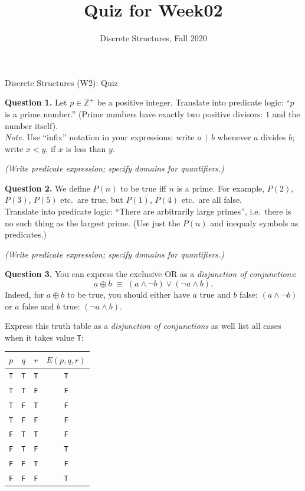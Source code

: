\documentclass[jou]{apa6}
\title{Quiz for Week02}
\author{Discrete Structures, Fall 2020}
\affiliation{RBS}
\begin{document}

\twocolumn
{\Large Discrete Structures (W2): Quiz}

\thispagestyle{empty}

\vspace{6pt}
{\bf Question 1.} Let $p \in \mathbb{Z}^{+}$ be a positive integer.
Translate into predicate logic: ``$p$ is a prime number.'' (Prime numbers
have exactly two positive divisors: $1$ and the number itself).\\
{\em Note.} Use ``infix'' notation in your expressions: write 
$a\,\mid\,b$ whenever $a$ divides $b$; write $x < y$, if $x$ is less than $y$.

{\scriptsize \em (Write predicate expression; specify domains for quantifiers.)}


\vspace{40pt}
{\bf Question 2.} We define $P(n)$ to be true
iff $n$ is a prime. For example, 
$P(2)$, $P(3)$, $P(5)$ etc.\ are true,
but $P(1)$, $P(4)$ etc.\ are all false.\\
Translate into predicate logic: ``There are arbitrarily large primes'', i.e.\ there is no 
such thing as the largest prime.
(Use just the $P(n)$ and inequaly symbols as predicates.)

\noindent
{\scriptsize \em (Write predicate expression; specify domains for quantifiers.)}



\vspace{40pt}
{\bf Question 3.} You can express the exclusive OR as a {\em disjunction of conjunctions}:
$$a \oplus b \;\equiv\; (a \wedge \neg b) \vee (\neg a \wedge b).$$ 
Indeed, for $a \oplus b$ to be true, you should 
either have $a$ true and $b$ false: $(a \wedge \neg b)$ or 
$a$ false and $b$ true: $(\neg a \wedge b)$. 

Express this truth table as a {\em disjunction of conjunctions} as well \textendash{}
list all cases when it takes value {\tt T}:

\begin{tabular}{ c | c | c | c }
$p$ & $q$ & $r$ & $E(p,q,r)$ \\ \hline
{\tt T} & {\tt T} & {\tt T} & {\tt T} \\ \hline
{\tt T} & {\tt T} & {\tt F} & {\tt F} \\ \hline
{\tt T} & {\tt F} & {\tt T} & {\tt F} \\ \hline
{\tt T} & {\tt F} & {\tt F} & {\tt F} \\ \hline
{\tt F} & {\tt T} & {\tt T} & {\tt F} \\ \hline
{\tt F} & {\tt T} & {\tt F} & {\tt T} \\ \hline
{\tt F} & {\tt F} & {\tt T} & {\tt F} \\ \hline
{\tt F} & {\tt F} & {\tt F} & {\tt T} \\ \hline
\end{tabular}
\end{document}
